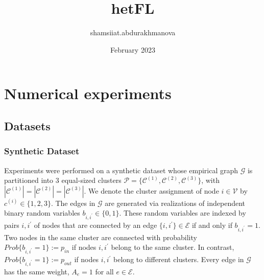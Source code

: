 \documentclass{article}
\title{hetFL}
\author{shamsiiat.abdurakhmanova }
\date{February 2023}
\begin{document}
\maketitle

\section{Numerical experiments}

\subsection{Datasets}

\subsubsection{Synthetic Dataset}

Experiments were performed on a synthetic dataset whose empirical graph $\mathcal {G}$ is partitioned into 3 equal-sized clusters $\mathcal{P} = \{\mathcal{C}^{(1)}, \mathcal{C}^{(2)}, \mathcal{C}^{(3)}\}$, with $|\mathcal{C}^{(1)}|=|\mathcal{C}^{(2)}|=|\mathcal{C}^{(3)}|$. We denote the cluster assignment of node $i \in \mathcal{V}$ by ${c}^{(i)} \in \{1,2,3\}$. The edges in $\mathcal {G}$  are generated via realizations of independent binary random variables ${b}_{i,{i}^{'}} \in \{0,1\}$. These random variables are indexed by pairs $i,{i}^{'}$ of nodes that are connected by an edge $\{i,{i}^{'}\} \in \mathcal{E}$ if and only if ${b}_{i,{i}^{'}}=1$. \\
Two nodes in the same cluster are connected with probability $Prob\{{b}_{i,{i}^{'}}=1\} :={p}_{in}$ if nodes $i,{i}^{'}$ belong to the same cluster. In contrast, $Prob\{{b}_{i,{i}^{'}}=1\} :={p}_{out}$ if nodes $i,{i}^{'}$ belong to different clusters. Every edge in  $\mathcal {G}$ has the same weight, ${A}_{e}=1$ for all $e \in \mathcal{E}$.
\end{document}
